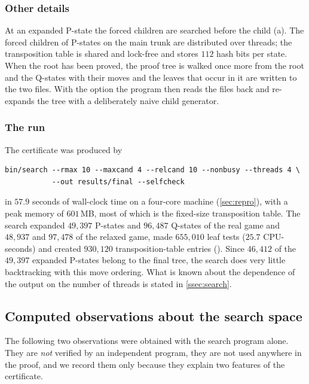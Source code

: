 \subsubsection*{Other details}
At an expanded P-state the forced children are searched before the child (a). The forced children of
P-states on the main trunk are distributed over threads; the transposition table is shared and lock-free
and stores $112$ hash bits per state. When the root has been proved, the proof tree is walked once more
from the root and the Q-states with their moves and the leaves that occur in it are written to the two
files. With the option  the program then reads the files back and re-expands the tree with
a deliberately naive child generator.

\subsubsection*{The run}
The certificate was produced by
\begin{verbatim}
bin/search --rmax 10 --maxcand 4 --relcand 10 --nonbusy --threads 4 \
           --out results/final --selfcheck
\end{verbatim}
in $57.9$ seconds of wall-clock time on a four-core machine (\cref{sec:repro}), with a peak memory of
$601$\,MB, most of which is the fixed-size transposition table. The search expanded $49{,}397$ P-states
and $96{,}487$ Q-states of the real game and $48{,}937$ and $97{,}478$ of the relaxed game, made
$655{,}010$ leaf tests ($25.7$ CPU-seconds) and created $930{,}120$ transposition-table entries
(\fn{results/final/stats.json}). Since $46{,}412$ of the $49{,}397$ expanded P-states belong to the final
tree, the search does very little backtracking with this move ordering. What is known about the
dependence of the output on the number of threads is stated in \cref{ssec:search}.

\subsection{Computed observations about the search space}\label{ssec:supp-observations}

The following two observations were obtained with the search program alone. They are \emph{not} verified
by an independent program, they are not used anywhere in the proof, and we record them only because they
explain two features of the certificate.

